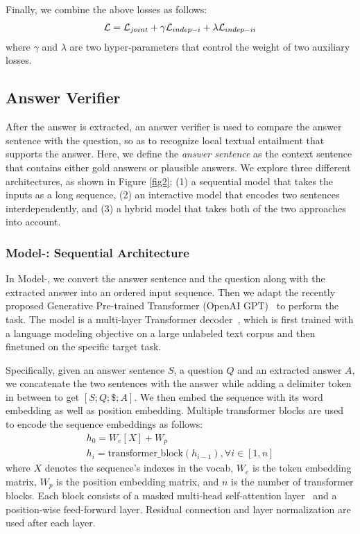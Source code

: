 \documentclass[letterpaper]{article} \usepackage{aaai19}  \usepackage{times}  \usepackage{helvet}  \usepackage{courier}  \usepackage{url}  \usepackage{graphicx}  \usepackage{pbox}
\begin{document}
Finally, we combine the above losses as follows:
\begin{eqnarray} 
	\mathcal{L} = \mathcal{L}_{joint} + \gamma \mathcal{L}_{indep-\uppercase\expandafter{\romannumeral1}} + \lambda \mathcal{L}_{indep-\uppercase\expandafter{\romannumeral2}}	\nonumber
\end{eqnarray}
where $\gamma$ and $\lambda$ are two hyper-parameters that control the weight of two auxiliary losses.


\subsection{Answer Verifier}
After the answer is extracted, an answer verifier is used to compare the answer sentence with the question, so as to recognize local textual entailment that supports the answer.
Here, we define the \emph{answer sentence} as the context sentence that contains either gold answers or plausible answers.
We explore three different architectures, as shown in Figure \ref{fig2}: 
(1) a sequential model that takes the inputs as a long sequence, (2) an interactive model that encodes two sentences interdependently, and (3) a hybrid model that takes both of the two approaches into account.

\subsubsection{Model-\uppercase\expandafter{}: Sequential Architecture}
In Model-\uppercase\expandafter{}, we convert the answer sentence and the question along with the extracted answer into an ordered input sequence. 
Then we adapt the recently proposed Generative Pre-trained Transformer (OpenAI GPT)~\cite{Radford18} to perform the task. 
The model is a multi-layer Transformer decoder~\cite{Liu18}, which is first trained with a language modeling objective on a large unlabeled text corpus and then finetuned on the specific target task.

Specifically, given an answer sentence $S$, a question $Q$ and an extracted answer $A$, we concatenate the two sentences with the answer while adding a delimiter token in between to get $[S; Q; \$; A]$. 
We then embed the sequence with its word embedding as well as position embedding.
Multiple transformer blocks are used to encode the sequence embeddings as follows:
\begin{gather}
    h_0 = W_e[X] + W_p  \nonumber \\
    h_i = \mathrm{transformer\_block}(h_{i-1}), \forall i \in [1,n]	\nonumber
\end{gather}
where $X$ denotes the sequence's indexes in the vocab, $W_e$ is the token embedding matrix, $W_p$ is the position embedding matrix, and $n$ is the number of transformer blocks. 
Each block consists of a masked multi-head self-attention layer~\cite{vaswani2017attention} and a position-wise feed-forward layer. Residual connection and layer normalization are used after each layer.
\end{document}
